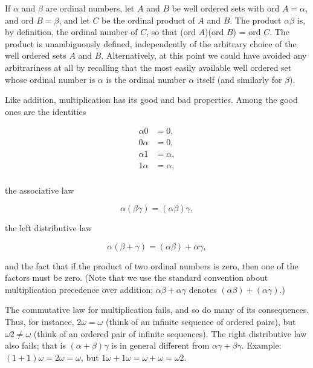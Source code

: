If $\alpha$ and $\beta$ are ordinal numbers, let $A$ and $B$ be well ordered sets with ord $A = \alpha$, and ord $B = \beta$, and let $C$ be the ordinal product of $A$ and $B$. The product $\alpha \beta$ is, by definition, the ordinal number of $C$, so that (ord $A$)(ord $B$) = ord $C$. The product is unambiguously  defined, independently of the arbitrary choice of the well ordered sets $A$ and $B$. Alternatively, at this point we could have avoided any arbitrariness at all by recalling that the most easily available well ordered set whose  ordinal number is $\alpha$ is the ordinal number $\alpha$ itself (and similarly for $\beta$). 

Like addition, multiplication has its good and bad properties.   Among the good ones are the identities 

\begin{align*}
\alpha 0 &= 0,\\
0 \alpha &= 0,\\
\alpha 1 &= \alpha ,\\
1 \alpha &= \alpha ,\\
\end{align*}

the associative law 

\begin{equation*}
\alpha ( \beta \gamma) = ( \alpha \beta ) \gamma , 
\end{equation*}

the left distributive law

\begin{equation*}
\alpha ( \beta  +\gamma) = ( \alpha \beta ) + \alpha \gamma , 
\end{equation*}

and the fact that if the product of two ordinal numbers is zero, then one of the factors must be zero. (Note that we use the standard convention about multiplication precedence over addition; $\alpha \beta + \alpha \gamma$ denotes $(\alpha \beta) + (\alpha \gamma)$.) 

The commutative law for multiplication fails, and so do many of its consequences. Thus, for instance, $2 \omega = \omega$ (think of an infinite sequence of ordered pairs), but $\omega 2 \neq \omega$ (think of an ordered pair of infinite sequences). The right distributive law also fails; that is $(\alpha + \beta) \gamma$ is in general different from $\alpha \gamma + \beta \gamma$. Example: $(1 + 1) \omega = 2 \omega = \omega$, but $1 \omega + 1 \omega = \omega + \omega = \omega 2$. 

